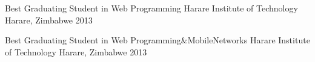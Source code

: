 



\begin{cvhonors}



   \cvhonor
    {Best Graduating Student in Web Programming} %
    {Harare Institute of Technology} %
    {Harare, Zimbabwe} %
    {2013} %


\cvhonor
{Best Graduating Student in Web Programming\&MobileNetworks} %
{Harare Institute of Technology} %
{Harare, Zimbabwe} %
{2013} %

\end{cvhonors}


